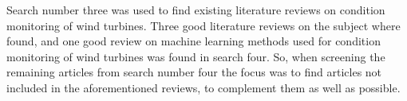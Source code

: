 Search number three was used to find existing literature reviews on condition monitoring of wind turbines. Three good literature reviews on the subject where found, and one good review on machine learning methods used for condition monitoring of wind turbines was found in search four. So, when screening the remaining articles from search number four the focus was to find articles not included in the aforementioned reviews, to complement them as well as possible. \bigskip
